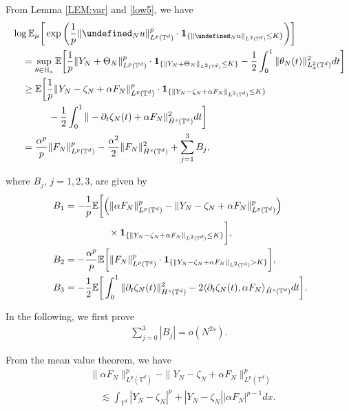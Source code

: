 \documentclass[letterpaper, 11pt,  reqno]{amsart}
\newcommand{\noi}{\noindent}
\newcommand{\T}{\mathbb{T}}
\let\P= \undefined
\newcommand{\P}{\mathbf{P}}
\newcommand{\E}{\mathbb{E}}
\newcommand{\al}{\alpha}
\newcommand{\dt}{\partial_t}
\newcommand{\jb}[1]
{\langle #1 \rangle}
\newcommand{\ind}{\mathbf 1}
\numberwithin{equation}{section}
\numberwithin{theorem}{section}
\newcommand{\ze}{\zeta}
\newcommand{\Dr}{\Theta}
\begin{document}
\noi
From 
Lemma \ref{LEM:var}
and \eqref{low5}, we have 
\begin{align}
\begin{split}
& \log \E_{\mu}\bigg[ 
\exp\bigg( \frac 1 p \| \P_N u\|^p_{L^p(\T^d)} \cdot 
 \ind_{\{ \| \P_{N} u \|_{L^2 (\mathbb{T}^d)}\leq K \}}\bigg)\bigg] \\
& \quad = \sup_{\theta\in \mathbb{H}_a}\E \bigg[
\frac{1}{p}\|Y_N+\Dr_N\|^p_{L^p(\T^d)} \cdot \ind_{\{\|Y_N+\Dr_N\|_{L^2(\T^d)}\le K\}}
-\frac{1}{2}\int_{0}^{1}\|\theta_N(t)\|^2_{L_x^2(\T^d)}dt\bigg]\\
& \quad  \ge \E\bigg[\frac{1}{p}\|Y_N-\ze_N+\al F_N\|^p_{L^p(\T^d)}
 \cdot \ind_{\{\|Y_N-\ze_N+\al F_N\|_{L^2(\T^d)}\le K\}}\\
& \quad  \phantom{XXX}
-\frac{1}{2}\int_{0}^{1}\|- \dt \ze_N(t)+\alpha F_N\|^2_{\dot H^s (\T^d) }dt\bigg]\\
& \quad 
=\frac{\alpha^p}{p}\|F_N\|^p_{L^p(\T^d)}-\frac{\alpha^2}{2}\|F_N\|^2_{\dot H^{s}(\T^d)}
+\sum_{j=1}^3B_j,
\end{split}
\label{low6}
\end{align}


\noi
where $B_j$, $j = 1, 2, 3$, are given by 
\begin{align}
\begin{split}
 B_1& =-\frac{1}{p}
\E\bigg[\Big(\|\alpha F_N\|^p_{L^{p}(\T^d)}-\|Y_N-\ze_N+\alpha F_N\|^p_{L^p(\T^d)}\Big)\\
& \hphantom{XXXXX}
\times  \ind_{\{\|Y_N-\ze_N+\alpha F_N\|_{L^2(\T^d)}\le K\}}\bigg],\\
B_2 & =-\frac{\alpha^p}{p}\E\bigg[\|F_N\|^p_{L^p(\T^d)}
\cdot \ind_{\{\|Y_N-\ze_N+\alpha F_N\|_{L^2(\T^d)}>K\}} \bigg],\\\
B_3 & =-\frac{1}{2}\E\bigg[\int_{0}^1 
\|\dt \ze_N(t)\| ^2_{\dot H^s(\T^d)}-2 
\jb{ \dt \ze_N(t), \alpha F_N }_{\dot H^{s}(\T^d)}dt\bigg].
\end{split}
\label{low6a}
\end{align}


In the following, we first prove
\begin{align}
\sum_{j=0}^{3}|B_j|=o(N^{2s}).
\label{low7}
\end{align}

\noi
From the  mean value theorem, we have 
\begin{align*}
& \| \alpha F_N \|^p_{L^p (\mathbb{T}^d)} - \| Y_N - \ze_N  +
\alpha F_N \|^p_{L^p (\mathbb{T}^d)}\\
& \quad \lesssim \int_{\mathbb{T}^d} | Y_N - \ze_N  |^p + | Y_N - \ze_N| | \alpha F_N |^{p-1} d x.
\end{align*}
\end{document}
